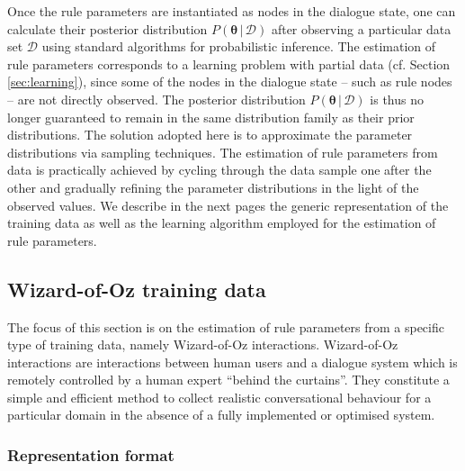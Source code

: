 Once the rule parameters are instantiated as nodes in the dialogue state, one can calculate their posterior distribution $P(\boldsymbol\theta \, | \, \mathcal{D})$ after observing a particular data set $\mathcal{D}$ using standard algorithms for probabilistic inference. The estimation of rule parameters corresponds to a learning problem with partial data (cf. Section \ref{sec:learning}), since some of the nodes in the dialogue state  -- such as rule nodes -- are not directly observed. The posterior distribution $P(\boldsymbol\theta \, | \, \mathcal{D})$ is thus no longer guaranteed to remain in the same distribution family as their prior distributions.  The solution adopted here is to approximate the parameter distributions via sampling techniques.
The estimation of rule parameters from data is practically achieved by cycling through the data sample one after the other and gradually refining the parameter distributions in the light of the observed values. We describe in the next pages the generic representation of the training data as well as the learning algorithm employed for the estimation of rule parameters.

\subsection{Wizard-of-Oz training data}
\label{sec:rule-supervised-oz}

The focus of this section is on the estimation of rule parameters from a specific type of training data, namely Wizard-of-Oz interactions. Wizard-of-Oz interactions are interactions between human users and a dialogue system which is remotely controlled by a human expert ``behind the curtains''.  They constitute a simple and efficient method to collect realistic conversational behaviour for a particular domain in the absence of a fully implemented or optimised system. 


\subsubsection*{Representation format}


